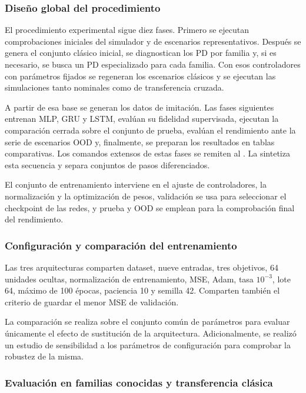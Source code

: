 \subsubsection*{Diseño global del procedimiento}

El procedimiento experimental sigue diez fases. Primero se ejecutan
comprobaciones iniciales del simulador y de escenarios representativos. Después
se genera el conjunto clásico inicial, se diagnostican los PD por familia y, si
es necesario, se busca un PD especializado para cada familia. Con esos controladores
con parámetros fijados se regeneran los escenarios clásicos y se ejecutan las simulaciones
tanto nominales como de transferencia cruzada.

A partir de esa base se generan los datos de imitación. Las fases siguientes entrenan
MLP, GRU y LSTM, evalúan su fidelidad supervisada, ejecutan la comparación cerrada sobre
el conjunto de prueba, evalúan el rendimiento ante la serie de escenarios OOD y, finalmente,
se preparan los resultados en tablas comparativas. Los comandos extensos de estas
fases se remiten al . La 
sintetiza esta secuencia y separa conjuntos de pasos diferenciados.

El conjunto de entrenamiento interviene en el ajuste de controladores, la
normalización y la optimización de pesos, validación se usa para seleccionar el
checkpoint de las redes, y prueba y OOD se emplean para la comprobación final del
rendimiento.

\subsubsection*{Configuración y comparación del entrenamiento}

Las tres arquitecturas comparten dataset, nueve entradas, tres objetivos, 64 unidades
ocultas, normalización de entrenamiento, MSE, Adam, tasa $10^{-3}$, lote 64, máximo de
100 épocas, paciencia 10 y semilla 42. Comparten también el criterio de guardar
el menor MSE de validación.

La comparación se realiza sobre el conjunto común de parámetros para evaluar únicamente
el efecto de sustitución de la arquitectura. Adicionalmente, se realizó un estudio
de sensibilidad a los parámetros de configuración para comprobar la robustez de la misma. 

\subsubsection*{Evaluación en familias conocidas y transferencia clásica}

